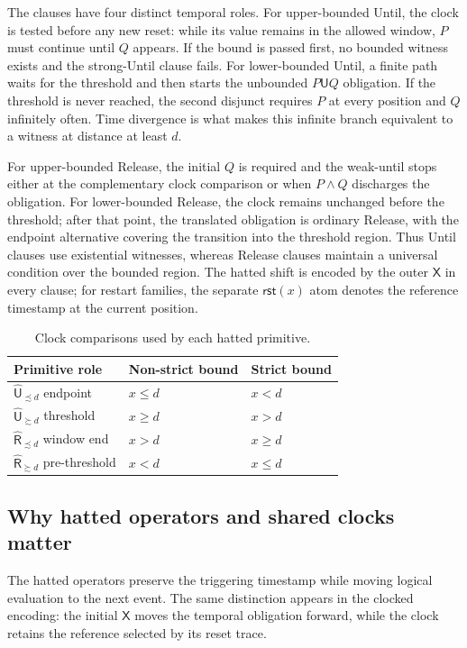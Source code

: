 \documentclass[10pt,journal,compsoc]{IEEEtran}
\newcommand{\Until}{\mathbin{\mathsf{U}}}
\newcommand{\hUntil}{\mathbin{\widehat{\mathsf{U}}}}
\newcommand{\hRelease}{\mathbin{\widehat{\mathsf{R}}}}
\newcommand{\Next}{\mathsf{X}}
\newcommand{\Reset}{\mathsf{rst}}
\begin{document}
The clauses have four distinct temporal roles. For upper-bounded Until, the
clock is tested before any new reset: while its value remains in the allowed
window, $P$ must continue until $Q$ appears. If the bound is passed first, no
bounded witness exists and the strong-Until clause fails. For
lower-bounded Until, a finite path waits for the threshold and then starts
the unbounded $P\Until Q$ obligation. If the threshold is never reached,
the second disjunct requires $P$ at every position and $Q$ infinitely often.
Time divergence is what makes this infinite branch equivalent to a witness
at distance at least $d$.

For upper-bounded Release, the initial $Q$ is required and the weak-until
stops either at the complementary clock comparison or when $P\land Q$
discharges the obligation. For lower-bounded Release, the clock remains
unchanged before the threshold; after that point, the translated obligation
is ordinary Release, with the endpoint alternative covering the transition
into the threshold region. Thus Until clauses use existential witnesses,
whereas Release clauses maintain a universal condition over the bounded
region. The hatted shift is encoded by the outer $\Next$ in every clause;
for restart families, the separate $\Reset(x)$ atom denotes the reference
timestamp at the current position.

\begin{table}[t]
\centering
\caption{Clock comparisons used by each hatted primitive.}
\label{tab:clock-tests}
\footnotesize
\begin{tabular}{@{}lll@{}}
\toprule
Primitive role & Non-strict bound & Strict bound\\
\midrule
$\hUntil_{\precsim d}$ endpoint & $x\le d$ & $x<d$\\
$\hUntil_{\succsim d}$ threshold & $x\ge d$ & $x>d$\\
$\hRelease_{\precsim d}$ window end & $x>d$ & $x\ge d$\\
$\hRelease_{\succsim d}$ pre-threshold & $x<d$ & $x\le d$\\
\bottomrule
\end{tabular}
\end{table}

\subsection{Why hatted operators and shared clocks matter}
The hatted operators preserve the triggering timestamp while moving logical
evaluation to the next event. The same distinction appears in the clocked
encoding: the initial $\Next$ moves the temporal obligation forward, while
the clock retains the reference selected by its reset trace.
\end{document}
